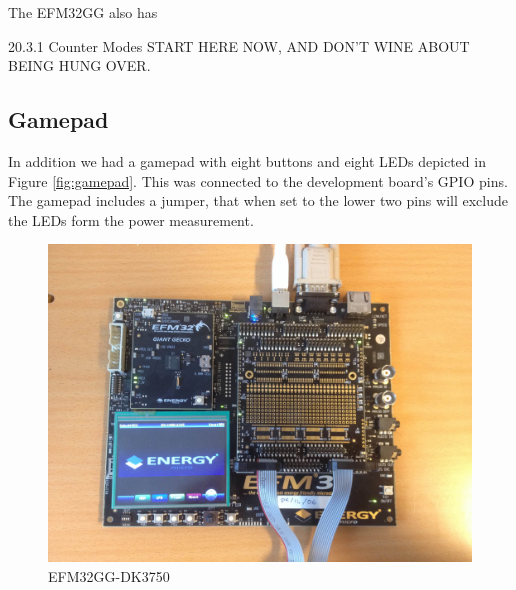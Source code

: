 The EFM32GG also has 

20.3.1 Counter Modes START HERE NOW, AND DON'T WINE ABOUT BEING HUNG OVER.


\subsection{Gamepad}
In addition we had a gamepad with eight buttons and eight LEDs depicted in Figure \ref{fig:gamepad}. This was connected to the development board's GPIO pins. The gamepad includes a jumper, that when set to the lower two pins will exclude the LEDs form the power measurement. 

\begin{figure}
\centering
\includegraphics[scale=0.1]{images/EFM32GG-DK3750.jpg}
\caption{EFM32GG-DK3750}
\label{fig:devboard}
\end{figure}

